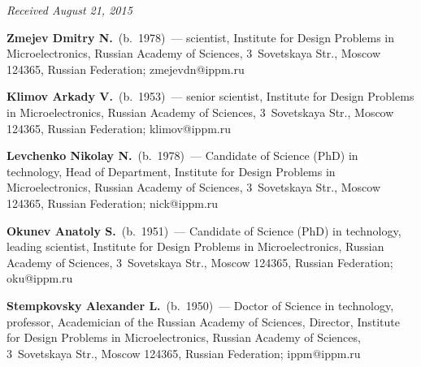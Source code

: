 \begin{multicols}{2}
{{ }
 }

\end{multicols}

\vspace*{-3pt}

\hfill{\small\textit{Received August 21, 2015}}
  
  \Contr
  
  \noindent
\textbf{Zmejev Dmitry N.}\ (b.\ 1978)~--- scientist, Institute for Design Problems in 
Microelectronics, Russian Academy of Sciences, 3~Sovetskaya Str., Moscow 
124365, Russian Federation; zmejevdn@ippm.ru

\vspace*{3pt}

\noindent
\textbf{Klimov Arkady V.}\ (b.\ 1953)~--- senior scientist, Institute for Design 
Problems in Microelectronics, Russian Academy of Sciences, 3~Sovetskaya Str., 
Moscow 124365, Russian Federation; klimov@ippm.ru

\vspace*{3pt}

\noindent
\textbf{Levchenko Nikolay N.}\ (b.\ 1978)~--- Candidate of Science (PhD) in 
technology, Head of Department, Institute for Design Problems in Microelectronics, 
Russian Academy of Sciences, 3~Sovetskaya Str., Moscow 124365, Russian 
Federation; nick@ippm.ru

\vspace*{3pt}

\noindent
\textbf{Okunev Anatoly S.}\ (b.\ 1951)~--- Candidate of Science (PhD) in 
technology, leading scientist, Institute for Design Problems in Microelectronics, 
Russian Academy of Sciences, 3~Sovetskaya Str., Moscow 124365, Russian 
Federation; oku@ippm.ru

\vspace*{3pt}

\noindent
\textbf{Stempkovsky Alexander L.}\ (b.\ 1950)~--- 
Doctor of Science in technology, professor, Academician of the Russian Academy of 
Sciences, Director, Institute for Design Problems in Microelectronics, Russian 
Academy of Sciences, 3~Sovetskaya Str., Moscow 124365, Russian Federation; 
ippm@ippm.ru

\label{end\stat}


\renewcommand{\bibname}{\protect\rm Литература}  